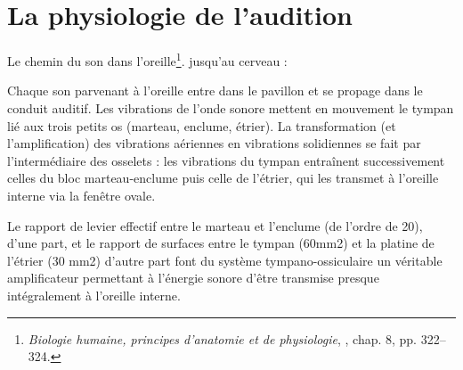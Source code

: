 


\section{La physiologie de l'audition}

Le chemin du son dans l'oreille\footnote{\textsl{Biologie humaine, principes d'anatomie et de physiologie}, \cite{marieb:biologie}, chap. 8, pp. 322--324.}. jusqu'au cerveau : 

Chaque son parvenant à l'oreille entre dans le pavillon et se propage
dans le conduit auditif. Les vibrations de l'onde sonore mettent en
mouvement le tympan lié aux trois petits os (marteau, enclume, étrier).
La transformation (et l\textquoteright amplification) des vibrations
aériennes en vibrations solidiennes se fait par l\textquoteright intermédiaire
des osselets : les vibrations du tympan entraînent successivement
celles du bloc marteau-enclume puis celle de l\textquoteright étrier,
qui les transmet à l\textquoteright oreille interne via la fenêtre
ovale.

Le rapport de levier effectif entre le marteau et l\textquoteright enclume
(de l\textquoteright ordre de 20), d\textquoteright une part, et le
rapport de surfaces entre le tympan (60mm2) et la platine de l\textquoteright étrier
(30 mm2) d\textquoteright autre part font du système tympano-ossiculaire
un véritable amplificateur permettant à l\textquoteright énergie sonore
d\textquoteright être transmise presque intégralement à l\textquoteright oreille
interne.

